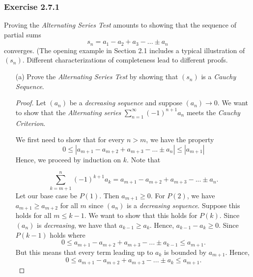 \subsubsection{Exercise 2.7.1} Proving the \textit{Alternating Series Test} amounts to showing that the sequence of partial sums 
\[ s_n = a_1 - a_2 + a_3 - ... \pm a_n\] converges. (The opening example in Section 2.1 includes a typical illustration of \((s_n)\). Different characterizations of completeness lead to different proofs. 
\begin{enumerate}
    \item[(a)] Prove the \textit{Alternating Series Test} by showing that \( (s_n)\) is a \textit{Cauchy Sequence}. 
        \begin{proof}
            Let \( (a_n)\) be a \textit{decreasing sequence} and suppose \( (a_n) \to 0 \). We want to show that the \textit{Alternating series} \( \sum_{n=1}^{\infty} (-1)^{n+1} a_n\) meets the \textit{Cauchy Criterion}. 

            We first need to show that for every \( n > m\), we have the property
            \[ 0 \leq |a_{m+1} - a_{m+2} + a_{m+3} - ... \pm a_n| \leq |a_{m+1}|\]
            Hence, we proceed by induction on \( k\). Note that 

            \[ \sum_{k=m+1}^{n} (-1)^{k+1}a_k = a_{m+1} - a_{m+2} + a_{m+3} - ... \pm a_n .\]
            Let our base case be \( P(1)\). Then \( a_{m+1} \geq 0\). For \( P(2)\), we have \( a_{m+1} \geq a_{m+2}\) for all \( m \) since \( (a_n)\) is a \textit{decreasing sequence}. Suppose this holds for all \( m \leq k-1   \). We want to show that this holds for \( P(k)\). Since \((a_n)\) is \textit{decreasing}, we have that \( a_{k-1} \geq a_{k}\). Hence, \( a_{k-1} - a_{k} \geq 0 \). Since \( P(k-1)\) holds where 
            \[ 0 \leq a_{m+1} - a_{m+2} + a_{m+3} - ... \pm a_{k-1} \leq a_{m+1}.\]
            But this means that every term leading up to \( a_k \) is bounded by \( a_{m+1}\). Hence, 
            \[ 0 \leq a_{m+1} - a_{m+2} + a_{m+3} - ... \pm a_k \leq a_{m+1}.\]
        

\end{proof}
\end{enumerate}
